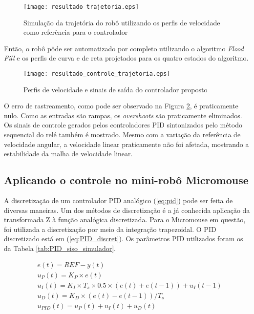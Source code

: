 \begin{figure}[!htb]
	\caption{\label{fig:resultado_trajetoria}Simulação da trajetória do robô utilizando os perfis de velocidade como referência para o controlador}
	\begin{center}
		\texttt{[image: resultado\_trajetoria.eps]}
	\end{center}
\end{figure}

Então, o robô pôde ser automatizado por completo utilizando o algoritmo \emph{Flood Fill} e os perfis de curva e de reta projetados para os quatro estados do algoritmo. 


\begin{figure}[!htb]
	\caption{\label{fig:resultado_controle_trajetoria}Perfis de velocidade e sinais de saída do controlador proposto}
	\begin{center}
		\texttt{[image: resultado\_controle\_trajetoria.eps]}
	\end{center}
\end{figure}

O erro de rastreamento, como pode ser observado na Figura \ref{fig:resultado_controle_trajetoria}, é praticamente nulo. Como as entradas são rampas, os \emph{overshoots} são praticamente eliminados. Os sinais de controle gerados pelos controladores PID sintonizados pelo método sequencial do relé também é mostrado. Mesmo com a variação da referência de velocidade angular, a velocidade linear praticamente não foi afetada, mostrando a estabilidade da malha de velocidade linear.


\subsection{Aplicando o controle no mini-robô Micromouse}

A discretização de um controlador PID analógico (\ref{eq:pid}) pode ser feita de diversas maneiras. Um dos métodos de discretização é a já conhecida aplicação da transformada Z à função analógica discretizada. Para o Micromouse em questão, foi utilizada a discretização por meio da integração trapezoidal. O PID discretizado está em (\ref{eq:PID_discret}). Os parâmetros PID utilizados foram os da Tabela \ref{tab:PID_siso_simulador}.

\begin{equation}
\label{eq:PID_discret}
	\begin{split}
		&e(t) = REF - y(t) \\
		&u_P(t) = K_P \times e(t)\\
		&u_I(t) = K_I \times T_s \times 0.5 \times (e(t) + e(t-1)) + u_I(t-1)\\
		&u_D(t) = K_D \times (e(t) - e(t-1))/T_s\\
		&u_{PID}(t) = u_P(t) + u_I(t) + u_D(t)\\
	\end{split}
\end{equation}

